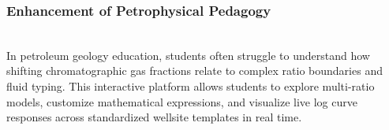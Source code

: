 \subsubsection{Enhancement of Petrophysical Pedagogy}~\\
In petroleum geology education, students often struggle to understand how shifting chromatographic gas fractions relate to complex ratio boundaries and fluid typing. This interactive platform allows students to explore multi-ratio models, customize mathematical expressions, and visualize live log curve responses across standardized wellsite templates in real time.